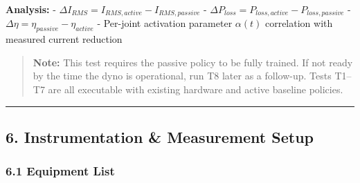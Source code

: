 \documentclass[
]{article}
\begin{document}
\textbf{Analysis:} -
\(\Delta I_{RMS} = I_{RMS,active} - I_{RMS,passive}\) -
\(\Delta P_{loss} = P_{loss,active} - P_{loss,passive}\) -
\(\Delta \eta = \eta_{passive} - \eta_{active}\) - Per-joint activation
parameter \(\alpha(t)\) correlation with measured current reduction

\begin{quote}
\textbf{Note:} This test requires the passive policy to be fully
trained. If not ready by the time the dyno is operational, run T8 later
as a follow-up. Tests T1--T7 are all executable with existing hardware
and active baseline policies.
\end{quote}

\begin{center}\rule{0.5\linewidth}{0.5pt}\end{center}

\subsection{6. Instrumentation \& Measurement
Setup}\label{instrumentation-measurement-setup}

\subsubsection{6.1 Equipment List}\label{equipment-list}
\end{document}
